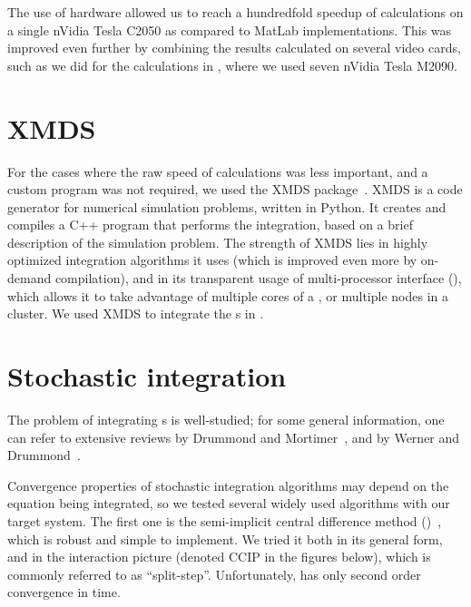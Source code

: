 The use of  hardware allowed us to reach a hundredfold speedup of calculations on a single nVidia Tesla C2050 as compared to MatLab implementations.
This was improved even further by combining the results calculated on several video cards, such as we did for the calculations in , where we used seven nVidia Tesla M2090.


\section{XMDS}

For the cases where the raw speed of calculations was less important, and a custom  program was not required, we used the XMDS package~\cite{Collecutt2001,Dennis2013}.
XMDS is a code generator for numerical simulation problems, written in Python.
It creates and compiles a C++ program that performs the integration, based on a brief  description of the simulation problem.
The strength of XMDS lies in highly optimized integration algorithms it uses (which is improved even more by on-demand compilation), and in its transparent usage of multi-processor interface (), which allows it to take advantage of multiple cores of a , or multiple nodes in a cluster.
We used XMDS to integrate the s in .


\section{Stochastic integration}

The problem of integrating s is well-studied; for some general information, one can refer to extensive reviews by Drummond and Mortimer~\cite{Drummond1991}, and by Werner and Drummond~\cite{Werner1997}.

Convergence properties of stochastic integration algorithms may depend on the equation being integrated, so we tested several widely used algorithms with our target system.
The first one is the semi-implicit central difference method ()~\cite{Werner1997}, which is robust and simple to implement.
We tried it both in its general form, and in the interaction picture (denoted CCIP in the figures below), which is commonly referred to as ``split-step''.
Unfortunately,  has only second order convergence in time.

